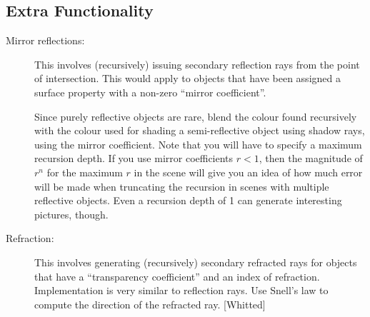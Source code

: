 \subsection{Extra Functionality}
\begin{description}
\item[Mirror reflections:] This involves (recursively) issuing 
    secondary reflection rays from the point of intersection.
    This would apply to
    objects that have been assigned a surface property with a non-zero 
    ``mirror coefficient''.

    Since purely reflective objects are rare,
    blend the colour found recursively with
    the colour used for shading a semi-reflective object using shadow rays,
    using the mirror coefficient.
    Note that you will have to specify a maximum recursion depth.
    If you use mirror coefficients $r < 1$, 
    then the magnitude of $r^n$ for the maximum
    $r$ in the scene will give you an idea of how much error will
    be made when truncating the recursion in scenes with multiple
    reflective objects.   Even a recursion depth of 1 can generate
    interesting pictures, though.
\item[Refraction:] This involves generating (recursively)
    secondary refracted rays
    for objects that have a ``transparency coefficient'' and an index
    of refraction.
    Implementation is very similar to reflection rays. 
    Use Snell's law to compute the direction of the refracted ray.
	[Whitted]


\end{description}
